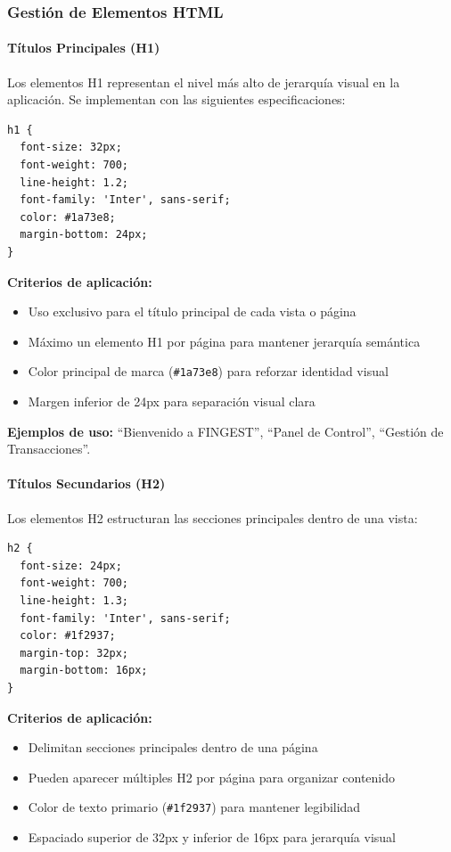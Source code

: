 \documentclass[12pt,a4paper,oneside]{article}
\begin{document}
\subsubsection{Gestión de Elementos HTML}

\paragraph{Títulos Principales (H1)}
Los elementos H1 representan el nivel más alto de jerarquía visual en la aplicación. Se implementan con las siguientes especificaciones:

\begin{verbatim}
h1 {
  font-size: 32px;
  font-weight: 700;
  line-height: 1.2;
  font-family: 'Inter', sans-serif;
  color: #1a73e8;
  margin-bottom: 24px;
}
\end{verbatim}

\textbf{Criterios de aplicación:}
\begin{itemize}
    \item Uso exclusivo para el título principal de cada vista o página
    \item Máximo un elemento H1 por página para mantener jerarquía semántica
    \item Color principal de marca (\texttt{\#1a73e8}) para reforzar identidad visual
    \item Margen inferior de 24px para separación visual clara
\end{itemize}

\textbf{Ejemplos de uso:} ``Bienvenido a FINGEST'', ``Panel de Control'', ``Gestión de Transacciones''.

\paragraph{Títulos Secundarios (H2)}
Los elementos H2 estructuran las secciones principales dentro de una vista:

\begin{verbatim}
h2 {
  font-size: 24px;
  font-weight: 700;
  line-height: 1.3;
  font-family: 'Inter', sans-serif;
  color: #1f2937;
  margin-top: 32px;
  margin-bottom: 16px;
}
\end{verbatim}

\textbf{Criterios de aplicación:}
\begin{itemize}
    \item Delimitan secciones principales dentro de una página
    \item Pueden aparecer múltiples H2 por página para organizar contenido
    \item Color de texto primario (\texttt{\#1f2937}) para mantener legibilidad
    \item Espaciado superior de 32px y inferior de 16px para jerarquía visual
\end{itemize}
\end{document}
